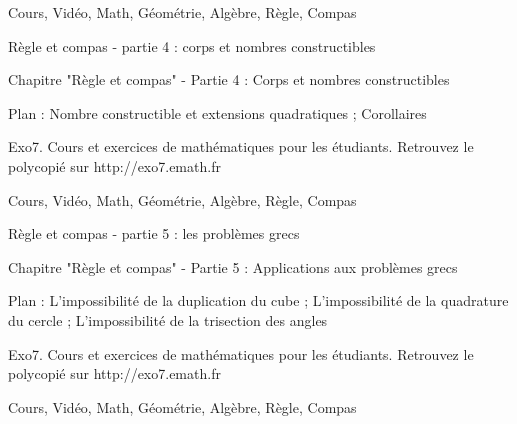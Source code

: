 
Cours, Vidéo, Math, Géométrie, Algèbre, Règle, Compas




Règle et compas - partie 4 : corps et nombres constructibles



Chapitre "Règle et compas" - Partie 4 : Corps et nombres constructibles

Plan : Nombre constructible et extensions quadratiques ; 
Corollaires

Exo7. Cours et exercices de mathématiques pour les étudiants.
Retrouvez le polycopié sur http://exo7.emath.fr


Cours, Vidéo, Math, Géométrie, Algèbre, Règle, Compas




Règle et compas - partie 5 : les problèmes grecs



Chapitre "Règle et compas" - Partie 5 : Applications aux problèmes grecs

Plan : L'impossibilité de la duplication du cube ; 
L'impossibilité de la quadrature du cercle ;
L'impossibilité de la trisection des angles


Exo7. Cours et exercices de mathématiques pour les étudiants.
Retrouvez le polycopié sur http://exo7.emath.fr


Cours, Vidéo, Math, Géométrie, Algèbre, Règle, Compas

